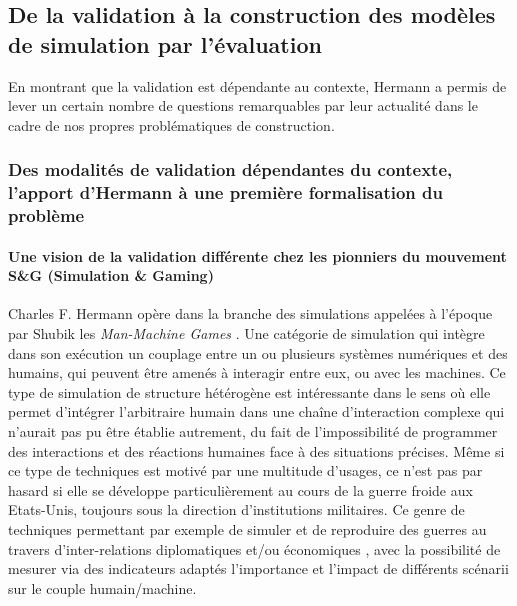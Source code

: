 
\subsection{De la validation à la construction des modèles de simulation par l'évaluation}
\label{ssec:evaluation_construction}


En montrant que la validation est dépendante au contexte, Hermann a permis de lever un certain nombre de questions remarquables par leur actualité dans le cadre de nos propres problématiques de construction.  %

\subsubsection{Des modalités de validation dépendantes du contexte, l'apport d'Hermann à une première formalisation du problème}
\label{sssec:hermann_contexte}

\paragraph{Une vision de la validation différente chez les pionniers du mouvement S\&G (Simulation \& Gaming)}

Charles F. Hermann opère dans la branche des simulations appelées à l'époque par Shubik les \textit{Man-Machine Games} \autocite{Shubik1972}. Une catégorie de simulation qui intègre dans son exécution un couplage entre un ou plusieurs systèmes numériques et des humains, qui peuvent être amenés à interagir entre eux, ou avec les machines. Ce type de simulation de structure hétérogène est intéressante dans le sens où elle permet d'intégrer l'arbitraire humain dans une chaîne d'interaction complexe qui n'aurait pas pu être établie autrement, du fait de l'impossibilité de programmer des interactions et des réactions humaines face à des situations précises. Même si ce type de techniques est motivé par une multitude d'usages, ce n'est pas par hasard si elle se développe particulièrement au cours de la guerre froide aux Etats-Unis, toujours sous la direction d'institutions militaires. Ce genre de techniques permettant par exemple de simuler et de reproduire des guerres au travers d'inter-relations diplomatiques et/ou économiques \autocite{Hermann1967b}, avec la possibilité de mesurer via des indicateurs adaptés l'importance et l'impact de différents scénarii sur le couple humain/machine.

